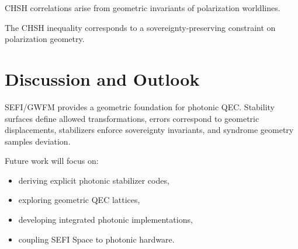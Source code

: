 \documentclass[12pt,twoside]{article}
\begin{document}
CHSH correlations arise from geometric invariants of polarization worldlines.

The CHSH inequality corresponds to a sovereignty-preserving constraint on polarization
geometry.

\section{Discussion and Outlook}

SEFI/GWFM provides a geometric foundation for photonic QEC. Stability surfaces define
allowed transformations, errors correspond to geometric displacements, stabilizers enforce
sovereignty invariants, and syndrome geometry samples deviation.

Future work will focus on:

\begin{itemize}
    \item deriving explicit photonic stabilizer codes,
    \item exploring geometric QEC lattices,
    \item developing integrated photonic implementations,
    \item coupling SEFI Space to photonic hardware.
\end{itemize}

\end{document}
